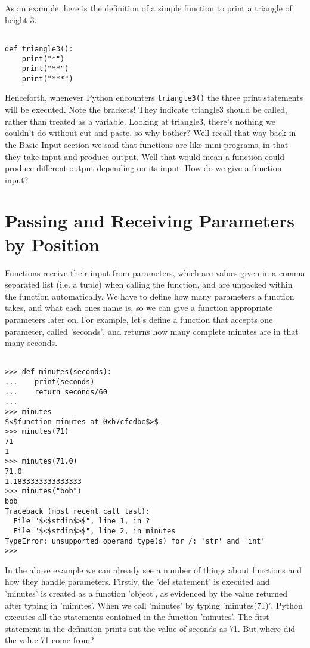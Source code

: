 As an example, here is the definition of a simple function to print   a triangle of height 3.
\begin{lstlisting}

def triangle3():
    print("*")
    print("**")
    print("***")
\end{lstlisting}

Henceforth, whenever Python encounters 
\texttt{triangle3()} the   three print statements will be executed. Note the brackets! They   indicate triangle3 should be called, rather than treated as a variable.   Looking at triangle3, there's nothing we couldn't do without cut   and paste, so why bother? Well recall that way back in the Basic Input   section we said that functions are like mini-programs, in that they   take input and produce output. Well that would mean a function could   produce different output depending on its input. How do we give a   function input?

\section{Passing and Receiving Parameters by Position}

Functions receive their input from parameters, which are values   given in a comma separated list (i.e. a tuple) when calling the   function, and are unpacked within the function automatically. We have   to define how many parameters a function takes, and what each ones   name is, so we can give a function appropriate parameters later   on. For example, let's define a function that accepts one parameter,   called 'seconds', and returns how many complete minutes are in that many   seconds.
\begin{lstlisting}

>>> def minutes(seconds):
...    print(seconds)
...    return seconds/60
...
>>> minutes
$<$function minutes at 0xb7cfcdbc$>$
>>> minutes(71)
71
1
>>> minutes(71.0)
71.0
1.1833333333333333
>>> minutes("bob")
bob
Traceback (most recent call last):
  File "$<$stdin$>$", line 1, in ?
  File "$<$stdin$>$", line 2, in minutes
TypeError: unsupported operand type(s) for /: 'str' and 'int'
>>>
\end{lstlisting}

In the above example we can already see a number of things about   functions and how they handle parameters. Firstly, the 'def statement'   is executed and 'minutes' is created as a function 'object', as   evidenced by the value returned after typing in 'minutes'. When we call 'minutes' by typing 'minutes(71)', Python   executes all the statements contained in the function 'minutes'.   The first statement in the definition prints out the value of seconds   as 71. But where did the value 71 come from?

